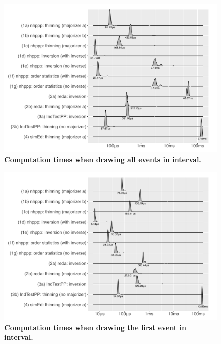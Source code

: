 \documentclass[article,nojss]{jss}\usepackage[]{graphicx}\usepackage[]{xcolor}
\makeatletter
\def\maxwidth{ %
  \ifdim\Gin@nat@width>\linewidth
    \linewidth
  \else
    \Gin@nat@width
  \fi
}
\makeatother
\begin{document}
\begin{Schunk}
\begin{figure}[ht!]
\caption[Computation times when drawing all events in interval]{\textbf{Computation times when drawing all events in interval.}}\label{fig:comptimes_all_samples}
\includegraphics[width=\maxwidth]{figure/comptimes_all_samples-1.pdf} 
\end{figure}
\end{Schunk}


\begin{Schunk}
\begin{figure}[ht!]
\caption[Computation times when drawing the first event in interval]{{\bf Computation times when drawing the first event in interval.}}\label{fig:comptimes_one_sample}
\includegraphics[width=\maxwidth]{figure/comptimes_one_sample-1.pdf} 
\end{figure}
\end{Schunk}
\end{document}
